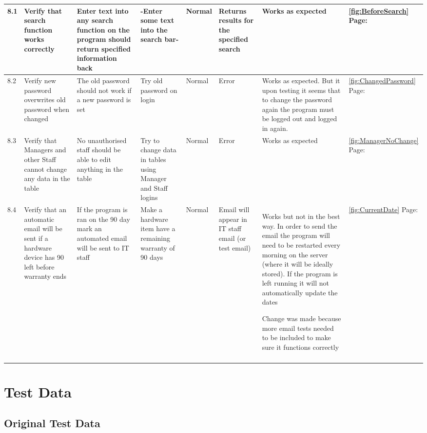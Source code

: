 \begin{landscape}
\begin{center}
\begin{longtable}{|p{1.5cm}|p{2cm}|p{2.5cm}|p{2cm}|p{2cm}|p{2cm}|p{3cm}|p{1.7cm}|}
8.1 & Verify that search function works correctly & Enter text into any search function on the program should return specified information back & -Enter some text into the search bar- & Normal & Returns results for the specified search &Works as expected&\ref {fig:BeforeSearch} Page: \pageref{fig:BeforeSearch}  \\ \hline 
8.2 & Verify new password overwrites old password when changed & The old password should not work if a new password is set & Try old password on login & Normal & Error & Works as expected. But it upon testing it seems that to change the password again the program must be logged out and logged in again.&\ref {fig:ChangedPassword} Page: \pageref{fig:ChangedPassword}  \\ \hline
8.3 & Verify that Managers and other Staff cannot change any data in the table & No unauthorised staff should be able to edit anything in the table & Try to change data in tables using Manager and Staff logins & Normal & Error &Works as expected&\ref {fig:ManagerNoChange}  Page: \pageref{fig:ManagerNoChange}  \\ \hline 
\rowcolor{lightgray}8.4 & Verify that an automatic email will be sent if a hardware device has 90 left before warranty ends &If the program is ran on the 90 day mark an automated email will be sent to IT staff &Make a hardware item have a remaining warranty of 90 days &Normal&Email will appear in IT staff email (or test email) & Works but not in the best way. In order to send the email the program will need to be restarted every morning on the server (where it will be ideally stored). If the program is left running it will not automatically update the dates \par Change was made because more email tests needed to be included to make sure it functions correctly &\ref {fig:CurrentDate} Page: \pageref{fig:CurrentDate}  \\ \hline


    \label{table:tests}
    \end{longtable}
\end{center}

\section{Test Data}

\subsection{Original Test Data}


\end{landscape}
